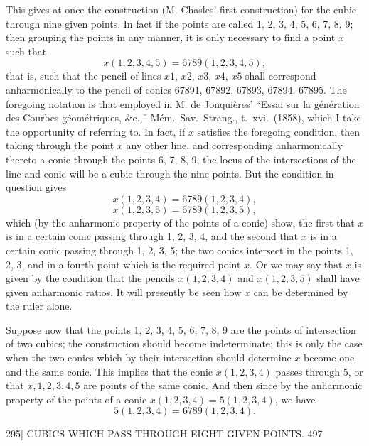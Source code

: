 \documentclass[11pt]{article}
\begin{document}
This gives at once the construction (M. Chasles' first construction) for the cubic
through nine given points. In fact if the points are called 1, 2, 3, 4, 5, 6, 7, 8, 9;
then grouping the points in any manner, it is only necessary to find a point $x$ such
that
\[ x(1,2,3,4,5) = 6789(1,2,3,4,5), \]
that is, such that the pencil of lines $x1$, $x2$, $x3$, $x4$, $x5$ shall correspond anharmonically
to the pencil of conics 67891, 67892, 67893, 67894, 67895. The foregoing notation is
that employed in M. de Jonqui\`eres' ``Essai sur la g\'en\'eration des Courbes g\'eom\'etriques,
\&c.,'' M\'em.\ Sav.\ Strang., t.\ xvi.\ (1858), which I take the opportunity of referring to.
In fact, if $x$ satisfies the foregoing condition, then taking through the point $x$ any
other line, and corresponding anharmonically thereto a conic through the points
6, 7, 8, 9, the locus of the intersections of the line and conic will be a cubic through
the nine points. But the condition in question gives
\[ x(1,2,3,4) = 6789(1,2,3,4), \]
\[ x(1,2,3,5) = 6789(1,2,3,5), \]
which (by the anharmonic property of the points of a conic) show, the first that $x$
is in a certain conic passing through 1, 2, 3, 4, and the second that $x$ is in a certain
conic passing through 1, 2, 3, 5; the two conics intersect in the points 1, 2, 3, and
in a fourth point which is the required point $x$. Or we may say that $x$ is given by
the condition that the pencils $x(1,2,3,4)$ and $x(1,2,3,5)$ shall have given
anharmonic ratios. It will presently be seen how $x$ can be determined by the ruler
alone.

Suppose now that the points 1, 2, 3, 4, 5, 6, 7, 8, 9 are the points of intersection
of two cubics; the construction should become indeterminate; this is only the case
when the two conics which by their intersection should determine $x$ become one and
the same conic. This implies that the conic $x(1,2,3,4)$ passes through 5, or that
$x, 1, 2, 3, 4, 5$ are points of the same conic. And then since by the anharmonic
property of the points of a conic $x(1,2,3,4)=5(1,2,3,4)$, we have
\[ 5(1,2,3,4)=6789(1,2,3,4). \]

\newpage
\begin{center}
\textsc{295]} \hfill CUBICS WHICH PASS THROUGH EIGHT GIVEN POINTS. \hfill 497
\end{center}
\end{document}
